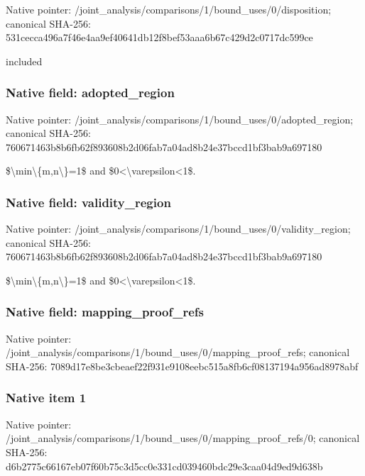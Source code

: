 \documentclass[10pt,a4paper]{article}
\begin{document}
Native pointer: /joint\_analysis/comparis\allowbreak{}ons/1/bound\_uses/0/dispo\allowbreak{}sition; canonical SHA-256: 531cecca496a7f46e4aa9ef4\allowbreak{}0641db12f8bef53aaa6b67c4\allowbreak{}29d2c0717dc599ce


included


\subsubsection{Native field: adopted\_region}


Native pointer: /joint\_analysis/comparis\allowbreak{}ons/1/bound\_uses/0/adopt\allowbreak{}ed\_region; canonical SHA-256: 760671463b8b6fb62f893608\allowbreak{}b2d06fab7a04ad8b24e37bcc\allowbreak{}d1bf3bab9a697180


\$\textbackslash{}min\textbackslash{}\{m,n\textbackslash{}\}=1\$ and \$0<\textbackslash{}varepsilon<1\$.


\subsubsection{Native field: validity\_region}


Native pointer: /joint\_analysis/comparis\allowbreak{}ons/1/bound\_uses/0/valid\allowbreak{}ity\_region; canonical SHA-256: 760671463b8b6fb62f893608\allowbreak{}b2d06fab7a04ad8b24e37bcc\allowbreak{}d1bf3bab9a697180


\$\textbackslash{}min\textbackslash{}\{m,n\textbackslash{}\}=1\$ and \$0<\textbackslash{}varepsilon<1\$.


\subsubsection{Native field: mapping\_proof\_refs}


Native pointer: /joint\_analysis/comparis\allowbreak{}ons/1/bound\_uses/0/mappi\allowbreak{}ng\_proof\_refs; canonical SHA-256: 7089d17e8be3cbeaef22f931\allowbreak{}e9108eebc515a8fb6cf08137\allowbreak{}194a956ad8978abf



\subsubsection{Native item 1}


Native pointer: /joint\_analysis/comparis\allowbreak{}ons/1/bound\_uses/0/mappi\allowbreak{}ng\_proof\_refs/0; canonical SHA-256: d6b2775c66167eb07f60b75c\allowbreak{}3d5cc0e331cd039460bdc29e\allowbreak{}3caa04d9ed9d638b
\end{document}
